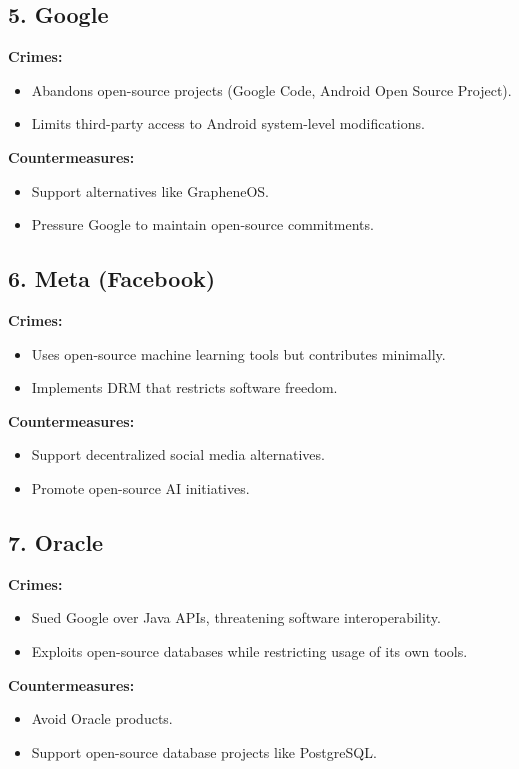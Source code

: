 \documentclass[12pt]{article}
\begin{document}
\subsection{5. Google}
\textbf{Crimes:}
\begin{itemize}
    \item Abandons open-source projects (Google Code, Android Open Source Project).
    \item Limits third-party access to Android system-level modifications.
\end{itemize}

\textbf{Countermeasures:}
\begin{itemize}
    \item Support alternatives like GrapheneOS.
    \item Pressure Google to maintain open-source commitments.
\end{itemize}

\subsection{6. Meta (Facebook)}
\textbf{Crimes:}
\begin{itemize}
    \item Uses open-source machine learning tools but contributes minimally.
    \item Implements DRM that restricts software freedom.
\end{itemize}

\textbf{Countermeasures:}
\begin{itemize}
    \item Support decentralized social media alternatives.
    \item Promote open-source AI initiatives.
\end{itemize}

\subsection{7. Oracle}
\textbf{Crimes:}
\begin{itemize}
    \item Sued Google over Java APIs, threatening software interoperability.
    \item Exploits open-source databases while restricting usage of its own tools.
\end{itemize}

\textbf{Countermeasures:}
\begin{itemize}
    \item Avoid Oracle products.
    \item Support open-source database projects like PostgreSQL.
\end{itemize}
\end{document}
